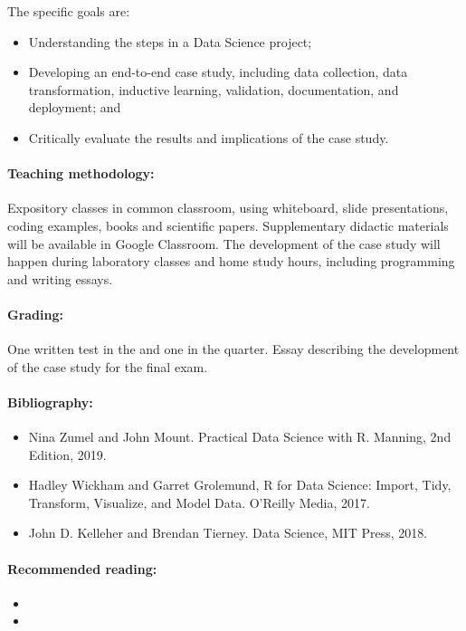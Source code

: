The specific goals are:
\begin{itemize}
  \item Understanding the steps in a Data Science project;
  \item Developing an end-to-end case study, including data collection, data transformation,
    inductive learning, validation, documentation, and deployment; and
  \item Critically evaluate the results and implications of the case study.
\end{itemize}

\paragraph{Teaching methodology:}
Expository classes in common classroom, using whiteboard, slide presentations, coding
examples, books and scientific papers. Supplementary didactic materials will be available
in Google Classroom. The development of the case study will happen during laboratory
classes and home study hours, including programming and writing essays.

\paragraph{Grading:} One written test in the  and one in the  quarter.
Essay describing the development of the case study for the final exam.

\paragraph{Bibliography:}
\begin{itemize}
  \item Nina Zumel and John Mount. Practical Data Science with R. Manning, 2nd Edition, 2019.
  \item Hadley Wickham and Garret Grolemund, R for Data Science: Import, Tidy, Transform, Visualize, and Model Data. O’Reilly Media, 2017.
  \item John D. Kelleher and Brendan Tierney. Data Science, MIT Press, 2018.
\end{itemize}

\paragraph{Recommended reading:}
\begin{itemize}
  \item {}
  \item {}
\end{itemize}

